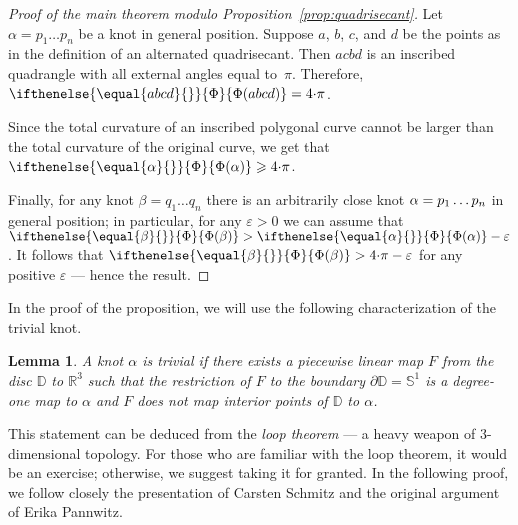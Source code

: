 \documentclass{article}
\newcommand*{\arXiv}[2]{#1} %
\newcommand*{\z}[1]{#1\nobreak\discretionary{}%
            {\hbox{$\mathsurround=0pt #1$}}{}}
\theoremstyle{theorem}
\newtheorem{Crofton-type formula}[theorem]{Crofton-type formula}
\newtheorem{Lemma}[theorem]{Lemma}
\newtheorem{Douglas--Rado theorem}[theorem]{\arXiv{Douglas--Rado theorem}{Theorem}}
\newtheorem{Extended monotonicity theorem}[theorem]{\arXiv{Extended monotonicity theorem}{Theorem}}
\theoremstyle{definition}
\def\DD{\mathbb{D}}
\def\RR{\mathbb{R}}
\newcommand*{\tc}[1]{\ifthenelse{\equal{#1}{}}{\Phi}{\Phi({#1})}}%
\def\eps{\varepsilon}
\def\ge{\geqslant}
\begin{document}
\begin{proof}[Proof of \arXiv{the main theorem}{Main Theorem} modulo Proposition~\ref{prop:quadrisecant}]
Let $\alpha=p_1\dots p_n$ be a knot in general position.
Suppose $a$, $b$, $c$, and $d$ be the points as in the definition of an alternated quadrisecant.
Then $acbd$ is an inscribed quadrangle with all external angles equal to~$\pi$.
Therefore, $\tc{abcd}=4\arXiv{{\cdot}}{}\pi$.

Since the total curvature of an inscribed polygonal curve cannot be larger than the total curvature of the original curve, we get that $\tc{\alpha}\z\ge 4\arXiv{{\cdot}}{}\pi$.

Finally, for any knot $\beta=q_1\dots q_n$ there is an arbitrarily close knot $\alpha\z=p_1\dots p_n$ in general position;
in particular, for any $\eps>0$ we can assume that $\tc{\beta}>\tc\alpha-\eps$.
It follows that $\tc{\beta}>4\arXiv{{\cdot}}{}\pi-\eps$ for any positive $\eps$ --- hence the result.
\end{proof}

In the proof of the proposition, we will use the following characterization of the trivial knot.

\begin{Lemma}\label{lem5}
A knot $\alpha$ is trivial if there exists a piecewise linear map $F$ from the disc $\DD$ to $\RR^3$ such that the  restriction of $F$ to the boundary $\partial\DD=\mathbb{S}^1$ is a degree-one map to $\alpha$ and $F$ does not map interior points of $\DD$ to $\alpha$.
\end{Lemma}

This statement can be deduced from  the \textit{loop theorem} --- a heavy weapon of 3-dimensional topology.
For those who are familiar with the loop theorem, it would be an exercise; otherwise, we suggest taking it for granted.
In the following proof, we follow closely the presentation of Carsten Schmitz \cite{schmitz} and the original argument of Erika Pannwitz.
\end{document}
